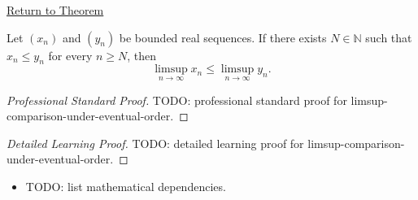 \newpage
{}
\label{prf:limsup-comparison-under-eventual-order}

\begin{remark*}[Return]
\hyperref[thm:limsup-comparison-under-eventual-order]{Return to Theorem}
\end{remark*}

\begin{theorem*}
Let $(x_n)$ and $(y_n)$ be bounded real sequences. If there exists
$N\in\mathbb{N}$ such that $x_n\le y_n$ for every $n\ge N$, then
\[
  \limsup_{n\to\infty}x_n
  \le
  \limsup_{n\to\infty}y_n.
\]

\smallskip
\noindent
\end{theorem*}

\begin{proof}[Professional Standard Proof]
\LRAProofBodyStart
TODO: professional standard proof for limsup-comparison-under-eventual-order.
\end{proof}

\begin{proof}[Detailed Learning Proof]
\LRAProofBodyStart
TODO: detailed learning proof for limsup-comparison-under-eventual-order.
\end{proof}

\begin{remark*}
\end{remark*}

\begin{dependencies}
\begin{itemize}
  \item TODO: list mathematical dependencies.
\end{itemize}
\end{dependencies}

\clearpage
